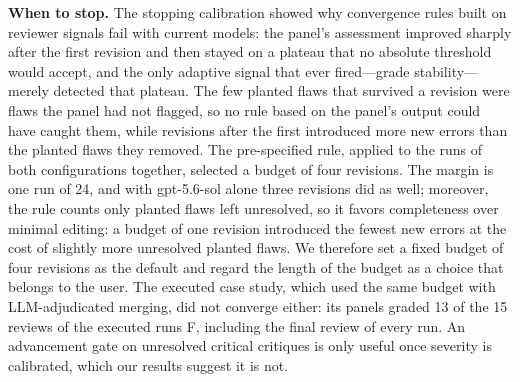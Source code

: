 \documentclass[10pt,letterpaper]{article}
\begin{document}
\textbf{When to stop.} The stopping calibration showed why convergence rules built on reviewer signals fail with current models: the panel's assessment improved sharply after the first revision and then stayed on a plateau that no absolute threshold would accept, and the only adaptive signal that ever fired---grade stability---merely detected that plateau. The few planted flaws that survived a revision were flaws the panel had not flagged, so no rule based on the panel's output could have caught them, while revisions after the first introduced more new errors than the planted flaws they removed. The pre-specified rule, applied to the runs of both configurations together, selected a budget of four revisions. The margin is one run of 24, and with gpt-5.6-sol alone three revisions did as well; moreover, the rule counts only planted flaws left unresolved, so it favors completeness over minimal editing: a budget of one revision introduced the fewest new errors at the cost of slightly more unresolved planted flaws. We therefore set a fixed budget of four revisions as the default and regard the length of the budget as a choice that belongs to the user. The executed case study, which used the same budget with LLM-adjudicated merging, did not converge either: its panels graded 13 of the 15 reviews of the executed runs F, including the final review of every run. An advancement gate on unresolved critical critiques is only useful once severity is calibrated, which our results suggest it is not.
\end{document}
